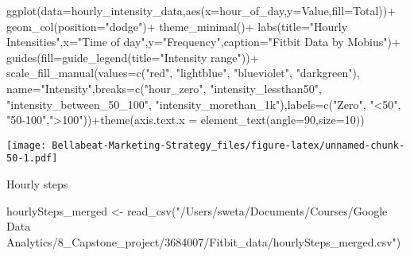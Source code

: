 \documentclass[
]{article}
\newenvironment{Shaded}{\begin{snugshade}}{\end{snugshade}}
\newcommand{\AttributeTok}[1]{\textcolor[rgb]{0.77,0.63,0.00}{#1}}
\newcommand{\DecValTok}[1]{\textcolor[rgb]{0.00,0.00,0.81}{#1}}
\newcommand{\FunctionTok}[1]{\textcolor[rgb]{0.00,0.00,0.00}{#1}}
\newcommand{\NormalTok}[1]{#1}
\newcommand{\OtherTok}[1]{\textcolor[rgb]{0.56,0.35,0.01}{#1}}
\newcommand{\SpecialCharTok}[1]{\textcolor[rgb]{0.00,0.00,0.00}{#1}}
\newcommand{\StringTok}[1]{\textcolor[rgb]{0.31,0.60,0.02}{#1}}
\begin{document}
\begin{Shaded}
\begin{Highlighting}[]
\FunctionTok{ggplot}\NormalTok{(}\AttributeTok{data=}\NormalTok{hourly\_intensity\_data,}\FunctionTok{aes}\NormalTok{(}\AttributeTok{x=}\NormalTok{hour\_of\_day,}\AttributeTok{y=}\NormalTok{Value,}\AttributeTok{fill=}\NormalTok{Total))}\SpecialCharTok{+}
  \FunctionTok{geom\_col}\NormalTok{(}\AttributeTok{position=}\StringTok{"dodge"}\NormalTok{)}\SpecialCharTok{+}
  \FunctionTok{theme\_minimal}\NormalTok{()}\SpecialCharTok{+}
  \FunctionTok{labs}\NormalTok{(}\AttributeTok{title=}\StringTok{"Hourly Intensities"}\NormalTok{,}\AttributeTok{x=}\StringTok{"Time of day"}\NormalTok{,}\AttributeTok{y=}\StringTok{"Frequency"}\NormalTok{,}\AttributeTok{caption=}\StringTok{"Fitbit Data by Mobius"}\NormalTok{)}\SpecialCharTok{+}
  \FunctionTok{guides}\NormalTok{(}\AttributeTok{fill=}\FunctionTok{guide\_legend}\NormalTok{(}\AttributeTok{title=}\StringTok{"Intensity range"}\NormalTok{))}\SpecialCharTok{+}
  \FunctionTok{scale\_fill\_manual}\NormalTok{(}\AttributeTok{values=}\FunctionTok{c}\NormalTok{(}\StringTok{"red"}\NormalTok{, }\StringTok{"lightblue"}\NormalTok{, }\StringTok{"blueviolet"}\NormalTok{, }\StringTok{"darkgreen"}\NormalTok{), }\AttributeTok{name=}\StringTok{"Intensity"}\NormalTok{,}\AttributeTok{breaks=}\FunctionTok{c}\NormalTok{(}\StringTok{"hour\_zero"}\NormalTok{, }\StringTok{"intensity\_lessthan50"}\NormalTok{, }\StringTok{"intensity\_between\_50\_100"}\NormalTok{, }\StringTok{"intensity\_morethan\_1k"}\NormalTok{),}\AttributeTok{labels=}\FunctionTok{c}\NormalTok{(}\StringTok{"Zero"}\NormalTok{, }\StringTok{"\textless{}50"}\NormalTok{, }\StringTok{"50{-}100"}\NormalTok{,}\StringTok{"\textgreater{}100"}\NormalTok{))}\SpecialCharTok{+}\FunctionTok{theme}\NormalTok{(}\AttributeTok{axis.text.x =} \FunctionTok{element\_text}\NormalTok{(}\AttributeTok{angle=}\DecValTok{90}\NormalTok{,}\AttributeTok{size=}\DecValTok{10}\NormalTok{))}
\end{Highlighting}
\end{Shaded}

\texttt{[image: Bellabeat-Marketing-Strategy\_files/figure-latex/unnamed-chunk-50-1.pdf]}

Hourly steps

\begin{Shaded}
\begin{Highlighting}[]
\NormalTok{hourlySteps\_merged }\OtherTok{\textless{}{-}} \FunctionTok{read\_csv}\NormalTok{(}\StringTok{"/Users/sweta/Documents/Courses/Google Data Analytics/8\_Capstone\_project/3684007/Fitbit\_data/hourlySteps\_merged.csv"}\NormalTok{)}
\end{Highlighting}
\end{Shaded}
\end{document}
